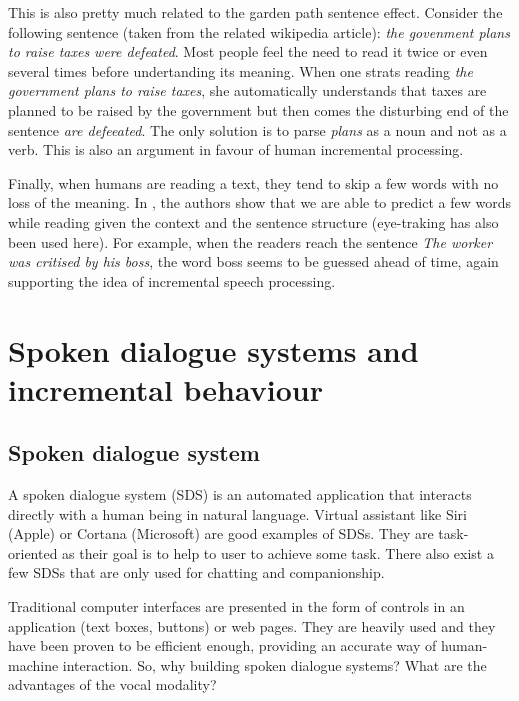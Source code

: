            This is also pretty much related to the garden path sentence effect. Consider the following sentence (taken from the related wikipedia article): \textit{the govenment plans to raise taxes were defeated}. Most people feel the need to read it twice or even several times before undertanding its meaning. When one strats reading \textit{the government plans to raise taxes}, she automatically understands that taxes are planned to be raised by the government but then comes the disturbing end of the sentence \textit{are defeeated}. The only solution is to parse \textit{plans} as a noun and not as a verb. This is also an argument in favour of human incremental processing.

           Finally, when humans are reading a text, they tend to skip a few words with no loss of the meaning. In \cite{Ilkin2011}, the authors show that we are able to predict a few words while reading given the context and the sentence structure (eye-traking has also been used here). For example, when the readers reach the sentence \textit{The worker was critised by his boss}, the word boss seems to be guessed ahead of time, again supporting the idea of incremental speech processing.


\section{Spoken dialogue systems and incremental behaviour}
    
	\subsection{Spoken dialogue system}
        \label{soa:sds}
        
	A spoken dialogue system (SDS) is an automated application that interacts directly with a human being in natural language. Virtual assistant like Siri (Apple) or Cortana (Microsoft) are good examples of SDSs. They are task-oriented as their goal is to help to user to achieve some task. There also exist a few SDSs that are only used for chatting and companionship.
	
	Traditional computer interfaces are presented in the form of controls in an application (text boxes, buttons) or web pages. They are heavily used and they have been proven to be efficient enough, providing an accurate way of human-machine interaction. So, why building spoken dialogue systems? What are the advantages of the vocal modality?
		
